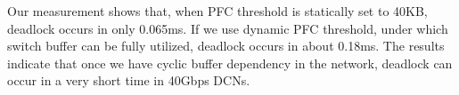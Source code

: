 Our measurement shows that, when PFC threshold is statically set to 40KB, deadlock occurs in only 0.065ms. If we use dynamic PFC threshold, under which switch buffer can be fully utilized, deadlock occurs in about 0.18ms. The results indicate that once we have cyclic buffer dependency in the network, deadlock can occur in a very short time in 40Gbps DCNs.
